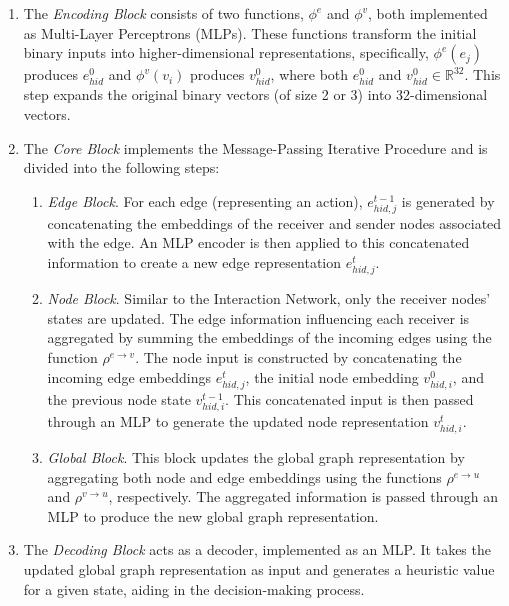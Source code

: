 \begin{enumerate}
    \item The \textit{Encoding Block} consists of two functions, $\phi^{e}$ and $\phi^{v}$, both implemented as Multi-Layer Perceptrons (MLPs). These functions transform the initial binary inputs into higher-dimensional representations, specifically, $\phi^{e}(e_j)$ produces $e_{hid}^{0}$ and $\phi^{v}(v_i)$ produces $v_{hid}^{0}$, where both $e_{hid}^{0}$ and $v_{hid}^{0} \in \mathbb{R}^{32}$. This step expands the original binary vectors (of size 2 or 3) into 32-dimensional vectors.

    \item The \textit{Core Block} implements the Message-Passing Iterative Procedure and is divided into the following steps:

        \begin{enumerate}
            \item \textit{Edge Block}. For each edge (representing an action), $e_{hid,j}^{t-1}$ is generated by concatenating the embeddings of the receiver and sender nodes associated with the edge. An MLP encoder is then applied to this concatenated information to create a new edge representation $e_{hid,j}^{t}$.

            \item \textit{Node Block}. Similar to the Interaction Network, only the receiver nodes' states are updated. The edge information influencing each receiver is aggregated by summing the embeddings of the incoming edges using the function $\rho^{e \rightarrow v}$. The node input is constructed by concatenating the incoming edge embeddings $e_{hid,j}^{t}$, the initial node embedding $v_{hid,i}^{0}$, and the previous node state $v_{hid,i}^{t-1}$. This concatenated input is then passed through an MLP to generate the updated node representation $v_{hid,i}^{t}$.

            \item \textit{Global Block}. This block updates the global graph representation by aggregating both node and edge embeddings using the functions $\rho^{e \rightarrow u}$ and $\rho^{v \rightarrow u}$, respectively. The aggregated information is passed through an MLP to produce the new global graph representation.
        \end{enumerate}

    \item The \textit{Decoding Block} acts as a decoder, implemented as an MLP. It takes the updated global graph representation as input and generates a heuristic value for a given state, aiding in the decision-making process.
\end{enumerate}


